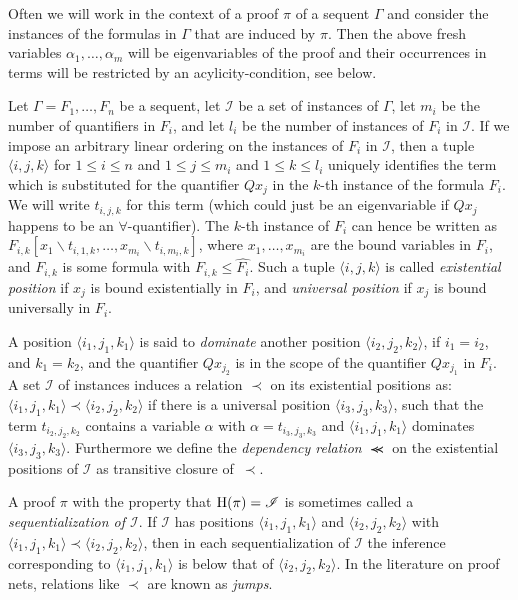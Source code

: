 \documentclass{LMCS}
\theoremstyle{plain}
\theoremstyle{definition}
\def\cI{{\mathcal I}}
\newcommand{\sop}{[}
\newcommand{\scl}{]}
\newcommand{\sel}[2]{#1 \backslash #2}
\newcommand{\Hsub}{\le}
\newcommand{\deprelz}{\prec}
\newcommand{\deprel}{\llcurly}
\begin{document}
Often we will work in the context of a proof $\pi$ of a sequent $\Gamma$ and
consider the instances of the formulas in $\Gamma$ that are induced by $\pi$.
Then the above fresh variables $\alpha_1,\ldots,\alpha_m$ will be eigenvariables
of the proof and their occurrences in terms will be restricted by an acylicity-condition, see below.

Let $\Gamma = F_1,\ldots,F_n$ be a sequent, let $\cI$ be a set of
instances of $\Gamma$, let $m_i$ be the number of quantifiers in
$F_i$, and let $l_i$ be the number of instances of $F_i$ in $\cI$. If
we impose an arbitrary linear ordering on the instances of $F_i$ in
$\cI$, then a tuple $\langle i, j, k \rangle$ for $1\leq i \leq n$ and
$1 \leq j \leq m_i$ and $1 \leq k \leq l_i$ uniquely identifies the
term which is substituted for the quantifier $Q x_j$ in the $k$-th
instance of the formula $F_i$. We will write $t_{i,j,k}$ for this term
(which could just be an eigenvariable if $Q x_j$ happens to be an
$\forall$-quantifier).  The $k$-th instance of $F_i$ can hence be
written as $F_{i,k}\sop
\sel{x_1}{t_{i,1,k}},\ldots,\sel{x_{m_i}}{t_{i,m_i,k}} \scl$, where
$x_1,\ldots,x_{m_i}$ are the bound variables in $F_i$, and $F_{i,k}$
is some formula with $F_{i,k}\Hsub\hat{F_i}$.  Such a tuple $\langle
i, j, k\rangle$ is called \emph{existential position} if $x_j$ is
bound existentially in $F_i$, and \emph{universal position} if $x_j$
is bound universally in $F_i$.

A position $\langle i_1,j_1,k_1 \rangle$ is said to \emph{dominate}
another position $\langle i_2,j_2,k_2 \rangle$, if $i_1 = i_2$, and
$k_1 = k_2$, and the quantifier $Q x_{j_2}$ is in the scope of the
quantifier $Q x_{j_1}$ in $F_i$. A set $\cI$ of instances induces a
relation $\deprelz$ on its existential positions as: $\langle
i_1,j_1,k_1 \rangle \deprelz \langle i_2,j_2,k_2 \rangle$ if there is
a universal position $\langle i_3,j_3,k_3 \rangle$, such that the term
$t_{i_2,j_2,k_2}$ contains a variable $\alpha$ with $\alpha =
t_{i_3,j_3,k_3}$ and $\langle i_1,j_1,k_1 \rangle$ dominates $\langle
i_3,j_3,k_3 \rangle$. Furthermore we define the \emph{dependency
  relation $\deprel$} on the existential positions of $\cI$ as
transitive closure of~$\deprelz$.

\begin{rem}
  A proof $\pi$ with the property that $\Hseq(\pi)=\cI$ is sometimes
  called a \emph{sequentialization of $\cI$}.  If $\cI$ has positions
  $\langle i_1,j_1,k_1 \rangle$ and $\langle i_2,j_2,k_2 \rangle$ with
  $\langle i_1,j_1,k_1 \rangle \deprelz \langle i_2,j_2,k_2 \rangle$,
  then in each sequentialization of $\cI$ the inference corresponding
  to $\langle i_1, j_1, k_1\rangle$ is below that of $\langle i_2,
  j_2, k_2\rangle$. In the literature on proof nets, relations like
  $\deprelz$ are known as \emph{jumps}.
\end{rem}
 
\end{document}
